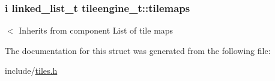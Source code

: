 \subsubsection[{\texorpdfstring{tilemaps}{tilemaps}}]{\setlength{\rightskip}{0pt plus 5cm}i {\bf linked\+\_\+list\+\_\+t} tileengine\+\_\+t\+::tilemaps}\hypertarget{structtileengine__t_accc82561bdd41b3046e3df58c519c75c}{}\label{structtileengine__t_accc82561bdd41b3046e3df58c519c75c}
$<$ Inherits from component List of tile maps 

The documentation for this struct was generated from the following file\+:\begin{DoxyCompactItemize}
\item 
include/\hyperlink{tiles_8h}{tiles.\+h}\end{DoxyCompactItemize}
